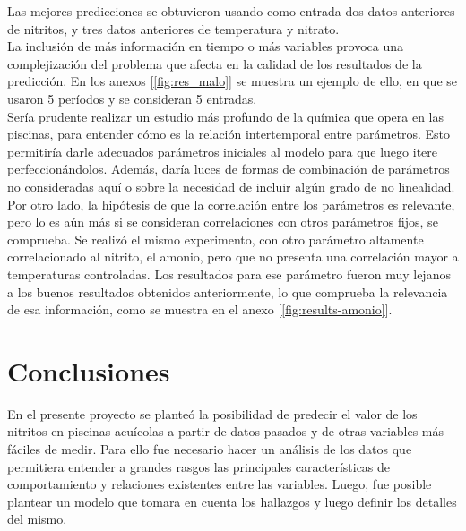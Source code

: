\documentclass[letterpaper, 12pt]{article}
\begin{document}
Las mejores predicciones se obtuvieron usando como entrada dos datos anteriores de nitritos, y tres datos anteriores de temperatura y nitrato.\\

La inclusión de más información en tiempo o más variables provoca una complejización del problema que afecta en la calidad de los resultados de la predicción. En los anexos [\ref{fig:res_malo}] se muestra un ejemplo de ello, en que se usaron 5 períodos y se consideran 5 entradas.\\

Sería prudente realizar un estudio más profundo de la química que opera en las piscinas, para entender cómo es la relación intertemporal entre parámetros. Esto permitiría darle adecuados parámetros iniciales al modelo para que luego itere perfeccionándolos. Además, daría luces de formas de combinación de parámetros no consideradas aquí o sobre la necesidad de incluir algún grado de no linealidad.\\

Por otro lado, la hipótesis de que la correlación entre los parámetros es relevante, pero lo es aún más si se consideran correlaciones con otros parámetros fijos, se comprueba. Se realizó el mismo experimento, con otro parámetro altamente correlacionado al nitrito, el amonio, pero que no presenta una correlación mayor a temperaturas controladas. Los resultados para ese parámetro fueron muy lejanos a los buenos resultados obtenidos anteriormente, lo que comprueba la relevancia de esa información, como se muestra en el anexo [\ref{fig:results-amonio}].

\section{Conclusiones}

En el presente proyecto se planteó la posibilidad de predecir el valor de los nitritos en piscinas acuícolas a partir de datos pasados y de otras variables más fáciles de medir. Para ello fue necesario hacer un análisis de los datos que permitiera entender a grandes rasgos las principales características de comportamiento y relaciones existentes entre las variables. Luego, fue posible plantear un modelo que tomara en cuenta los hallazgos y luego definir los detalles del mismo.\\
\end{document}
